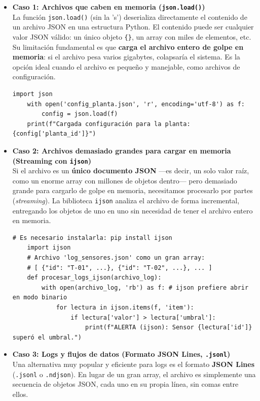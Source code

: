 \begin{itemize}
    \item \textbf{Caso 1: Archivos que caben en memoria (\texttt{json.load()})}\\
    La función \texttt{json.load()} (sin la 's') deserializa directamente el contenido de un archivo JSON en una estructura Python. El contenido puede ser cualquier valor JSON válido: un único objeto \texttt{\{\}}, un array con miles de elementos, etc. Su limitación fundamental es que \textbf{carga el archivo entero de golpe en memoria}: si el archivo pesa varios gigabytes, colapsaría el sistema. Es la opción ideal cuando el archivo es pequeño y manejable, como archivos de configuración.

    \begin{lstlisting}[style=PythonStyle, caption={Leyendo un archivo de configuración con \texttt{json.load()}}]
    import json
    with open('config_planta.json', 'r', encoding='utf-8') as f:
        config = json.load(f)
    print(f"Cargada configuración para la planta: {config['planta_id']}")
    \end{lstlisting}

    \item \textbf{Caso 2: Archivos demasiado grandes para cargar en memoria (Streaming con \texttt{ijson})}\\
    Si el archivo es un \textbf{único documento JSON} ---es decir, un solo valor raíz, como un enorme array con millones de objetos dentro--- pero demasiado grande para cargarlo de golpe en memoria, necesitamos procesarlo por partes (\textit{streaming}). La biblioteca \texttt{ijson} analiza el archivo de forma incremental, entregando los objetos de uno en uno sin necesidad de tener el archivo entero en memoria.

    \begin{lstlisting}[style=PythonStyle, caption={Procesando un array JSON masivo con \texttt{ijson}}]
    # Es necesario instalarla: pip install ijson
    import ijson
    # Archivo 'log_sensores.json' como un gran array:
    # [ {"id": "T-01", ...}, {"id": "T-02", ...}, ... ]
    def procesar_logs_ijson(archivo_log):
        with open(archivo_log, 'rb') as f: # ijson prefiere abrir en modo binario
            for lectura in ijson.items(f, 'item'):
                if lectura['valor'] > lectura['umbral']:
                    print(f"ALERTA (ijson): Sensor {lectura['id']} superó el umbral.")
    \end{lstlisting}

    \item \textbf{Caso 3: Logs y flujos de datos (Formato JSON Lines, \texttt{.jsonl})}\\
    Una alternativa muy popular y eficiente para logs es el formato \textbf{JSON Lines} (\texttt{.jsonl} o \texttt{.ndjson}). En lugar de un gran array, el archivo es simplemente una secuencia de objetos JSON, cada uno en su propia línea, sin comas entre ellos.
    

\end{itemize}

